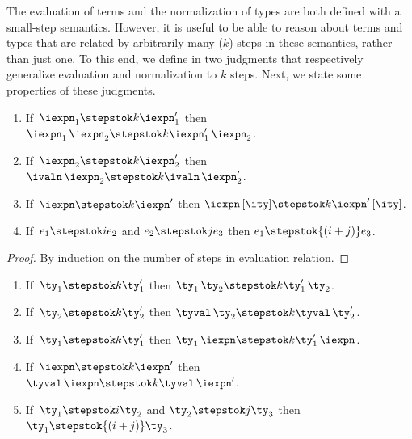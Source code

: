 The evaluation of \fomega{} terms and the normalization of \ddc{}
types are both defined with a small-step semantics. However, it is
useful to be able to reason about terms and types that are related by
arbitrarily many ($k$) steps in these semantics, rather than just one.
To this end,  we define in  two
judgments that respectively generalize evaluation and normalization to
$k$ steps. Next, we state some properties of these judgments.

\begin{lemma}
  \begin{enumerate}
  \item If $\,\iexpn_1 \stepstok k \iexpn_1'$ then $\iexpn_1 \, \iexpn_2
    \stepstok k \iexpn_1' \, \iexpn_2$.
  \item If $\,\iexpn_2 \stepstok k \iexpn_2'$ then $\ivaln \, \iexpn_2
    \stepstok k \ivaln \, \iexpn_2'$.
  \item If $\,\iexpn \stepstok k \iexpn'$ then $\iexpn \, [\ity]
    \stepstok k \iexpn' \, [\ity]$.
  \item If $\, e_1 \stepstok i e_2$ and $e_2 \stepstok j e_3$
    then $e_1 \stepstok {(i+j)} e_3$.
  \end{enumerate}
\label{lemma:kleene-eval}
\end{lemma}

\begin{proof}
  By induction on the number of steps in evaluation relation.
\end{proof}

\begin{lemma}
  \begin{enumerate}
  \item If $\,\ty_1 \stepstok k \ty_1'$ then $\ty_1 \, \ty_2
    \stepstok k \ty_1' \, \ty_2$.
  \item If $\,\ty_2 \stepstok k \ty_2'$ then $\tyval \, \ty_2
    \stepstok k \tyval \, \ty_2'$.
  \item If $\,\ty_1 \stepstok k \ty_1'$ then $\ty_1 \, \iexpn
    \stepstok k \ty_1' \, \iexpn$.
  \item If $\,\iexpn \stepstok k \iexpn'$ then $\tyval \, \iexpn
    \stepstok k \tyval \, \iexpn'$.
  \item If $\,\ty_1 \stepstok i \ty_2$ and $\ty_2 \stepstok j \ty_3$
    then $\ty_1 \stepstok {(i+j)} \ty_3$.
  \end{enumerate}
\label{lemma:kleene-norm}
\end{lemma}

